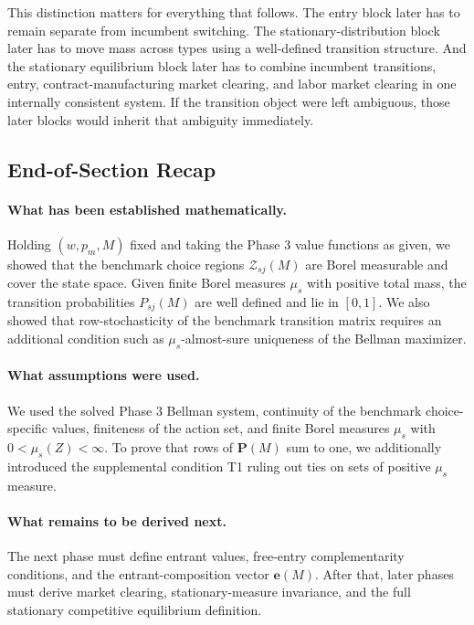 This distinction matters for everything that follows. The entry block later has to remain separate from incumbent switching. The stationary-distribution block later has to move mass across types using a well-defined transition structure. And the stationary equilibrium block later has to combine incumbent transitions, entry, contract-manufacturing market clearing, and labor market clearing in one internally consistent system. If the transition object were left ambiguous, those later blocks would inherit that ambiguity immediately.

\subsection{End-of-Section Recap}

\paragraph{What has been established mathematically.}
Holding $(w,p_m,M)$ fixed and taking the Phase 3 value functions as given, we showed that the benchmark choice regions $\mathcal Z_{sj}(M)$ are Borel measurable and cover the state space. Given finite Borel measures $\mu_s$ with positive total mass, the transition probabilities $P_{sj}(M)$ are well defined and lie in $[0,1]$. We also showed that row-stochasticity of the benchmark transition matrix requires an additional condition such as $\mu_s$-almost-sure uniqueness of the Bellman maximizer.

\paragraph{What assumptions were used.}
We used the solved Phase 3 Bellman system, continuity of the benchmark choice-specific values, finiteness of the action set, and finite Borel measures $\mu_s$ with $0<\mu_s(Z)<\infty$. To prove that rows of $\mathbf P(M)$ sum to one, we additionally introduced the supplemental condition T1 ruling out ties on sets of positive $\mu_s$ measure.

\paragraph{What remains to be derived next.}
The next phase must define entrant values, free-entry complementarity conditions, and the entrant-composition vector $\mathbf e(M)$. After that, later phases must derive market clearing, stationary-measure invariance, and the full stationary competitive equilibrium definition.
